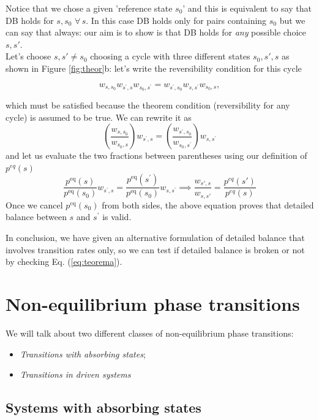 \documentclass[\main/main.tex]{subfiles}
\begin{document}
Notice that we chose a given 'reference state $s_0$' and this is equivalent to say that DB holds for $s,s_0\,\, \forall \,s$. 
In this case DB holds only for pairs containing $s_0$ but we can say that always: our aim is to show is that DB holds for \textit{any} possible choice $s,s'$. \\

Let's choose $s,s'\neq s_0$ choosing a cycle with three different states $s_0,s',s$ as shown in Figure \ref{fig:theor}b: let's write the reversibility condition for this cycle

$$w_{s, s_{0}} w_{s^{\prime}, s} w_{s_{0}, s^{\prime}}=w_{s^{\prime}, s_{0}} w_{s, s^{\prime}} w_{s_{0}, s},$$

which must be satisfied
because the theorem condition (reversibility for any cycle) is assumed to be true. We can rewrite it as
$$
\left(\frac{w_{s, s_{0}}}{w_{s_{0}, s}}\right) w_{s^{\prime}, s}=\left(\frac{w_{s^{\prime}, s_{0}}}{w_{s_{0}, s^{\prime}}}\right) w_{s, s^{\prime}}
$$
and let us evaluate the two fractions between parentheses using our definition of $p^{eq}(s)$
$$
\frac{p^{\mathrm{eq}}(s)}{p^{\mathrm{eq}}\left(s_{0}\right)} w_{s^{\prime}, s}=\frac{p^{\mathrm{eq}}\left(s^{\prime}\right)}{p^{\mathrm{eq}}\left(s_{0}\right)} w_{s, s^{\prime}} \implies \frac{w_{s',s}}{w_{s,s'}}=\frac{p^{eq}(s')}{p^{eq}(s)}
$$
Once we cancel $p^{\mathrm{cq}}\left(s_{0}\right)$ from both sides, the above equation proves that detailed balance between $s$ and $s^{\prime}$ is valid.

In conclusion, we have given an alternative formulation of detailed balance that involves transition rates only, so we can test if detailed balance is broken or not by checking Eq. (\ref{eq:teorema}).
\qquad \qquad \qquad\qquad\qquad \qquad \qquad \qquad \qquad  \qquad \qquad\qquad\quad  $\boxed{}$

\section{Non-equilibrium phase transitions}

We will talk about two different classes of non-equilibrium phase transitions:
\begin{itemize}
    \item \textit{Transitions with absorbing states};
    \item  \textit{Transitions in driven systems}
\end{itemize}
\subsection{Systems with absorbing states}
\end{document}
